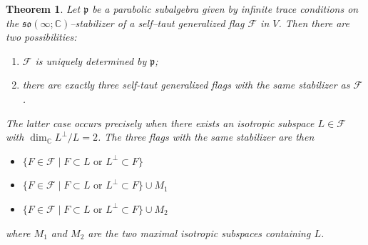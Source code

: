 \documentclass[oneside,leqno,11pt]{article}
\def\gp{\mathfrak{p}}
\def\gso{\mathfrak{so}}
\def\C{\mathbb{C}}
\def\cF{\mathcal{F}}
\newtheorem{theorem}[equation]{Theorem}
\begin{document}
\begin{theorem}\label{soc-flag-anomaly}
Let $\gp$ be a parabolic subalgebra given by infinite trace conditions on the  $\gso(\infty;\C)$--stabilizer  of a self--taut generalized flag $\cF$ in $V$.  Then there are two possibilities:
\begin{enumerate}
\item $\cF$ is uniquely determined by $\gp$;
\item there are exactly three self-taut generalized flags with the same stabilizer as $\cF$.
\end{enumerate}
The latter case occurs precisely when there exists an isotropic subspace $L \in \cF$ with  $\dim_\C L^\perp / L = 2$.  The three flags with the same stabilizer are then
\begin{itemize}
\item $\{F \in \cF \mid F \subset L \textrm{ or } L^\perp \subset F \}$
\item $\{F \in \cF \mid F \subset L \textrm{ or } L^\perp \subset F \} \cup M_1$
\item $\{F \in \cF \mid F \subset L \textrm{ or } L^\perp \subset F \} \cup M_2$
\end{itemize}
where $M_1$ and $M_2$ are the two maximal isotropic subspaces containing $L$.
\end{theorem}
\end{document}
